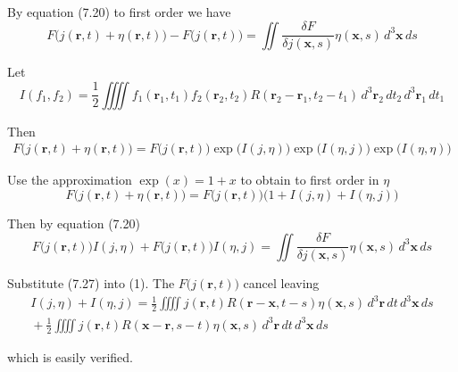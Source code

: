 


By equation (7.20) to first order we have
\begin{equation*}
F\big(j(\mathbf r,t)+\eta(\mathbf r,t)\big)
-F\big(j(\mathbf r,t)\big)
=\iint
\frac{\delta F}{\delta j(\mathbf x,s)}\eta(\mathbf x,s)\,d^3\mathbf x\,ds
\end{equation*}

Let
\begin{equation*}
I(f_1,f_2)=
\frac{1}{2}
\iiiint
f_1(\mathbf r_1,t_1)f_2(\mathbf r_2,t_2)R(\mathbf r_2-\mathbf r_1,t_2-t_1)
\,d^3\mathbf r_2\,dt_2\,d^3\mathbf r_1\,dt_1
\end{equation*}

Then
\begin{align*}
F\big(j(\mathbf r,t)+\eta(\mathbf r,t)\big)=F\big(j(\mathbf r,t)\big)
\exp\big(I(j,\eta)\big)\exp\big(I(\eta,j)\big)\exp\big(I(\eta,\eta)\big)
\end{align*}

Use the approximation $\exp(x)=1+x$ to obtain to first order in $\eta$
\begin{equation*}
F\big(j(\mathbf r,t)+\eta(\mathbf r,t)\big)
=F\big(j(\mathbf r,t)\big)\big(1+I(j,\eta)+I(\eta,j)\big)
\end{equation*}

Then by equation (7.20)
\begin{equation*}
F\big(j(\mathbf r,t)\big)I(j,\eta)+F\big(j(\mathbf r,t)\big)I(\eta,j)
=\iint
\frac{\delta F}{\delta j(\mathbf x,s)}\eta(\mathbf x,s)\,d^3\mathbf x\,ds
\tag{1}
\end{equation*}

Substitute (7.27) into (1).
The $F\big(j(\mathbf r,t)\big)$ cancel leaving
\begin{multline*}
I(j,\eta)+I(\eta,j)=
\frac{1}{2}\iiiint
j(\mathbf r,t)R(\mathbf r-\mathbf x,t-s)\eta(\mathbf x,s)\,d^3\mathbf r\,dt\,d^3\mathbf x\,ds
\\
{}+\frac{1}{2}\iiiint
j(\mathbf r,t)R(\mathbf x-\mathbf r,s-t)\eta(\mathbf x,s)\,d^3\mathbf r\,dt\,d^3\mathbf x\,ds
\end{multline*}

which is easily verified.


